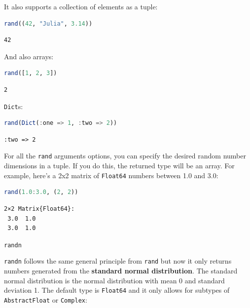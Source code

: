 \documentclass[
  notoc %
]{tufte-book}
\makeatletter
\newcommand{\passthrough}[1]{#1}
\renewcommand\subsubsection{%
\@startsection{subsubsection}{3}{\z@ }{-3.25ex\@plus -1ex \@minus -.2ex}{1.5ex \@plus .2ex}{\normalfont \normalsize \bfseries }
}
\makeatother
\begin{document}
It also supports a collection of elements as a tuple:

\begin{lstlisting}[language=Julia]
rand((42, "Julia", 3.14))
\end{lstlisting}

\begin{lstlisting}[language=Output]
42
\end{lstlisting}

And also arrays:

\begin{lstlisting}[language=Julia]
rand([1, 2, 3])
\end{lstlisting}

\begin{lstlisting}[language=Output]
2
\end{lstlisting}

\passthrough{\lstinline!Dict!}s:

\begin{lstlisting}[language=Julia]
rand(Dict(:one => 1, :two => 2))
\end{lstlisting}

\begin{lstlisting}[language=Output]
:two => 2
\end{lstlisting}

For all the \passthrough{\lstinline!rand!} arguments options, you can
specify the desired random number dimensions in a tuple. If you do this,
the returned type will be an array. For example, here's a 2x2 matrix of
\passthrough{\lstinline!Float64!} numbers between 1.0 and 3.0:

\begin{lstlisting}[language=Julia]
rand(1.0:3.0, (2, 2))
\end{lstlisting}

\begin{lstlisting}[language=Output]
2×2 Matrix{Float64}:
 3.0  1.0
 3.0  1.0
\end{lstlisting}

\hypertarget{sec:random_randn}{%
\subsubsection{\texorpdfstring{\texttt{randn}}{randn}}\label{sec:random_randn}}

\passthrough{\lstinline!randn!} follows the same general principle from
\passthrough{\lstinline!rand!} but now it only returns numbers generated
from the \textbf{standard normal distribution}. The standard normal
distribution is the normal distribution with mean 0 and standard
deviation 1. The default type is \passthrough{\lstinline!Float64!} and
it only allows for subtypes of \passthrough{\lstinline!AbstractFloat!}
or \passthrough{\lstinline!Complex!}:
\end{document}
